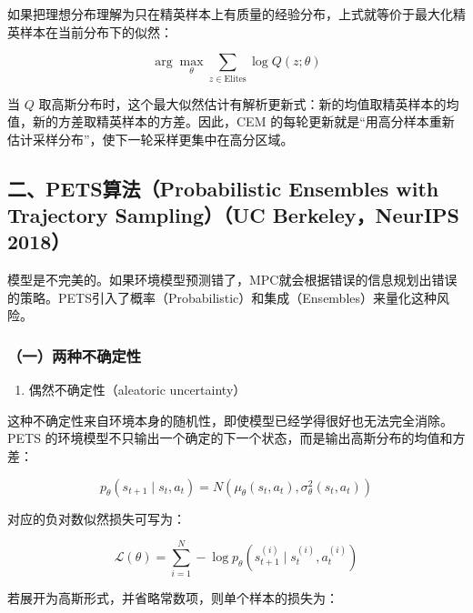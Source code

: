 如果把理想分布理解为只在精英样本上有质量的经验分布，上式就等价于最大化精英样本在当前分布下的似然：

\[
\arg\max_\theta\sum_{z\in\mathrm{Elites}}\log Q(z;\theta)
\]

当 \(Q\) 取高斯分布时，这个最大似然估计有解析更新式：新的均值取精英样本的均值，新的方差取精英样本的方差。因此，CEM 的每轮更新就是``用高分样本重新估计采样分布''，使下一轮采样更集中在高分区域。

\hypertarget{ux4e8cpetsux7b97ux6cd5probabilistic-ensembles-with-trajectory-samplinguc-berkeleyneurips-2018}{%
\subsection{二、PETS算法（Probabilistic Ensembles with Trajectory Sampling）（UC Berkeley，NeurIPS 2018）}\label{ux4e8cpetsux7b97ux6cd5probabilistic-ensembles-with-trajectory-samplinguc-berkeleyneurips-2018}}

模型是不完美的。如果环境模型预测错了，MPC就会根据错误的信息规划出错误的策略。PETS引入了概率（Probabilistic）和集成（Ensembles）来量化这种风险。

\hypertarget{ux4e00ux4e24ux79cdux4e0dux786eux5b9aux6027}{%
\subsubsection{（一）两种不确定性}\label{ux4e00ux4e24ux79cdux4e0dux786eux5b9aux6027}}

\begin{enumerate}
\def\labelenumi{\arabic{enumi}.}
\tightlist
\item
  偶然不确定性（aleatoric uncertainty）
\end{enumerate}

这种不确定性来自环境本身的随机性，即使模型已经学得很好也无法完全消除。PETS 的环境模型不只输出一个确定的下一个状态，而是输出高斯分布的均值和方差：

\[
p_\theta(s_{t+1}\mid s_t,a_t)=N(\mu_\theta(s_t,a_t),\sigma_\theta^2(s_t,a_t))
\]

对应的负对数似然损失可写为：

\[
\mathcal L(\theta)=\sum_{i=1}^{N}-\log p_\theta(s_{t+1}^{(i)}\mid s_t^{(i)},a_t^{(i)})
\]

若展开为高斯形式，并省略常数项，则单个样本的损失为：

